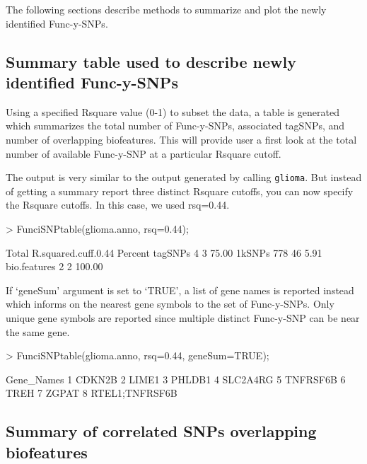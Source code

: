 \documentclass[12pt,fullpage]{article}
\newcommand{\Robject}[1]{{\texttt{#1}}}
\begin{document}
The following sections describe methods to summarize and plot the newly
identified Func-y-SNPs.

\subsection{Summary table used to describe newly identified Func-y-SNPs}

Using a specified Rsquare value (0-1) to subset the data, a table is generated
which summarizes the total number of Func-y-SNPs, associated tagSNPs, and number
of overlapping biofeatures. This will provide user a first look at the total
number of available Func-y-SNP at a particular Rsquare cutoff.

The output is very similar to the output generated by calling \Robject{glioma}.
But instead of getting a summary report three distinct Rsquare cutoffs, you can
now specify the Rsquare cutoffs.  In this case, we used rsq=0.44.

\begin{Schunk}
\begin{Sinput}
> FunciSNPtable(glioma.anno, rsq=0.44);
\end{Sinput}
\begin{Soutput}
             Total R.squared.cuff.0.44 Percent
tagSNPs          4                   3   75.00
1kSNPs         778                  46    5.91
bio.features     2                   2  100.00
\end{Soutput}
\end{Schunk}

If `geneSum' argument is set to `TRUE', a list of gene names is reported
instead which informs on the nearest gene symbols to the set of Func-y-SNPs.
Only unique gene symbols are reported since multiple distinct Func-y-SNP can be
near the same gene.

\begin{Schunk}
\begin{Sinput}
> FunciSNPtable(glioma.anno, rsq=0.44, geneSum=TRUE);
\end{Sinput}
\begin{Soutput}
      Gene_Names
1         CDKN2B
2          LIME1
3         PHLDB1
4       SLC2A4RG
5       TNFRSF6B
6           TREH
7          ZGPAT
8 RTEL1;TNFRSF6B
\end{Soutput}
\end{Schunk}

\subsection{Summary of correlated SNPs overlapping biofeatures}
\end{document}
